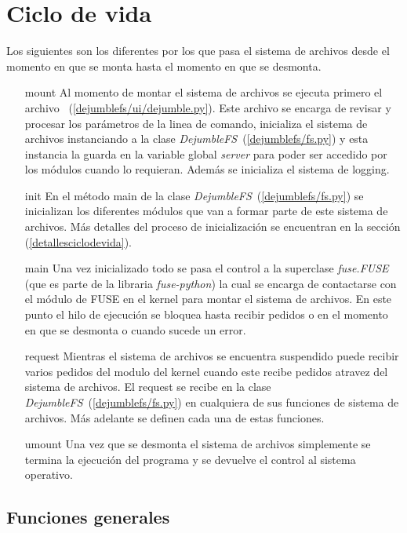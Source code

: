 \section{Ciclo de vida}

Los siguientes son los diferentes por los que pasa el sistema de archivos desde el momento en que se monta hasta el momento en que se desmonta.

\begin{itemize}
\item[mount] Al momento de montar el sistema de archivos se ejecuta primero el archivo ~(\ref{dejumblefs/ui/dejumble.py}). Este archivo se encarga de revisar y procesar los parámetros de la linea de comando, inicializa el sistema de archivos instanciando a la clase \textit{DejumbleFS}~(\ref{dejumblefs/fs.py}) y esta instancia la guarda en la variable global \textit{server} para poder ser accedido por los módulos cuando lo requieran. Además se inicializa el sistema de logging.
\item[init] En el método main de la clase \textit{DejumbleFS}~(\ref{dejumblefs/fs.py}) se inicializan los diferentes módulos que van a formar parte de este sistema de archivos. Más detalles del proceso de inicialización se encuentran en la sección (\ref{detallesciclodevida}).
\item[main] Una vez inicializado todo se pasa el control a la superclase \textit{fuse.FUSE} (que es parte de la libraria \textit{fuse-python}) la cual se encarga de contactarse con el módulo de FUSE en el kernel para montar el sistema de archivos. En este punto el hilo de ejecución se bloquea hasta recibir pedidos o en el momento en que se desmonta o cuando sucede un error.
\item[request] Mientras el sistema de archivos se encuentra suspendido puede recibir varios pedidos del modulo del kernel cuando este recibe pedidos atravez del sistema de archivos. El request se recibe en la clase \textit{DejumbleFS}~(\ref{dejumblefs/fs.py}) en cualquiera de sus funciones de sistema de archivos. Más adelante se definen cada una de estas funciones.
\item[umount] Una vez que se desmonta el sistema de archivos simplemente se termina la ejecución del programa y se devuelve el control al sistema operativo.
\end{itemize}

\subsection{Funciones generales}

